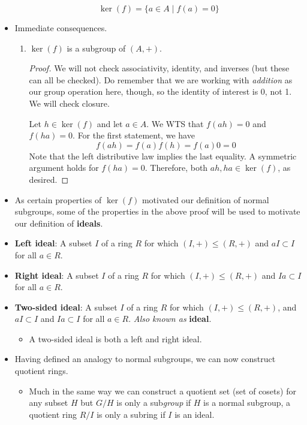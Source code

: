 \documentclass[../notes.tex]{subfiles}
\begin{document}
\begin{itemize}
    \begin{equation*}
        \ker(f) = \{a\in A\mid f(a)=0\}
    \end{equation*}
    \item Immediate consequences.
    \begin{enumerate}[label={(\roman*)}]
        \item $\ker(f)$ is a subgroup of $(A,+)$.
        \begin{proof}
            We will not check associativity, identity, and inverses (but these can all be checked). Do remember that we are working with \emph{addition} as our group operation here, though, so the identity of interest is 0, not 1. We will check closure.\par
            Let $h\in\ker(f)$ and let $a\in A$. We WTS that $f(ah)=0$ and $f(ha)=0$. For the first statement, we have
            \begin{equation*}
                f(ah) = f(a)f(h)
                = f(a)0
                = 0
            \end{equation*}
            Note that the left distributive law implies the last equality. A symmetric argument holds for $f(ha)=0$. Therefore, both $ah,ha\in\ker(f)$, as desired.
        \end{proof}
    \end{enumerate}
    \item As certain properties of $\ker(f)$ motivated our definition of normal subgroups, some of the properties in the above proof will be used to motivate our definition of \textbf{ideals}.
    \item \textbf{Left ideal}: A subset $I$ of a ring $R$ for which $(I,+)\leq(R,+)$ and $aI\subset I$ for all $a\in R$.
    \item \textbf{Right ideal}: A subset $I$ of a ring $R$ for which $(I,+)\leq(R,+)$ and $Ia\subset I$ for all $a\in R$.
    \item \textbf{Two-sided ideal}: A subset $I$ of a ring $R$ for which $(I,+)\leq(R,+)$, and $aI\subset I$ and $Ia\subset I$ for all $a\in R$. \emph{Also known as} \textbf{ideal}.
    \begin{itemize}
        \item A two-sided ideal is both a left and right ideal.
    \end{itemize}
    \item Having defined an analogy to normal subgroups, we can now construct quotient rings.
    \begin{itemize}
        \item Much in the same way we can construct a quotient set (set of cosets) for any subset $H$ but $G/H$ is only a sub\emph{group} if $H$ is a normal subgroup, a quotient ring $R/I$ is only a subring if $I$ is an ideal.

\end{itemize}
\end{itemize}
\end{document}
